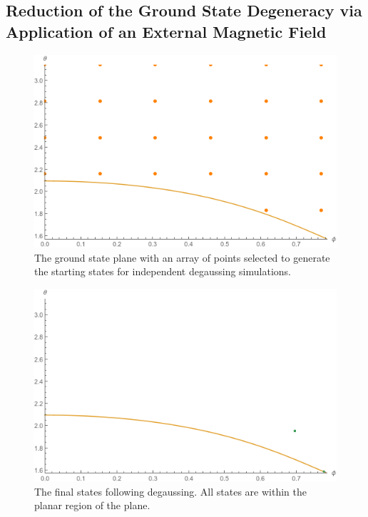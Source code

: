 \subsection{Reduction of the Ground State Degeneracy via Application of an External Magnetic Field}

\begin{figure}[ht]
 \centering
 \includegraphics[scale=0.6]{img/predegaussed.png}
 \caption{The ground state plane with an array of points selected to generate the starting states for independent degaussing simulations.}
\end{figure}

\begin{figure}[ht]
 \centering
 \includegraphics[scale=0.6]{img/postdegaussed.png}
 \caption{The final states following degaussing. All states are within the planar region of the plane.}
\end{figure}